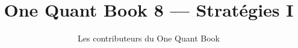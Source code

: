 \documentclass[11pt,a4paper,twoside,openany]{book}
\title{One Quant Book 8 --- Stratégies I}
\author{Les contributeurs du One Quant Book}
\date{\bookdate}
\begin{document}
\frontmatter



\tableofcontents

\mainmatter


\appendix
\part{\omsolutionspart}


\backmatter
\printindex
\end{document}
